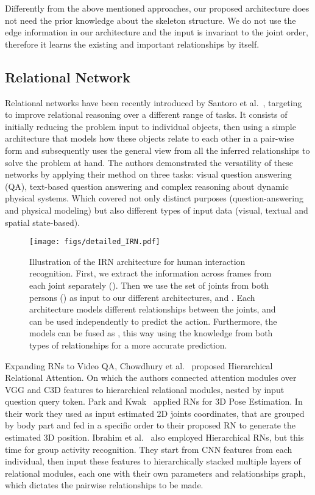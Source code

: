 \documentclass[journal,twoside]{IEEEtran}
\begin{document}
Differently from the above mentioned approaches, our proposed architecture does not need the prior knowledge about the skeleton structure.
We do not use the edge information in our architecture and the input is invariant to the joint order, therefore it learns the existing and important relationships by itself. 


\subsection{Relational Network}




Relational networks have been recently introduced by Santoro et al.~\cite{Santoro2017}, targeting to improve relational reasoning over a different range of tasks. 
It consists of initially reducing the problem input to individual objects, then using a simple architecture that models how these objects relate to each other in a pair-wise form and subsequently uses the general view from all the inferred relationships to solve the problem at hand.
The authors demonstrated the versatility of these networks by applying their method on three tasks: visual question answering (QA), text-based question answering and complex reasoning about dynamic physical systems. 
Which covered not only distinct purposes (question-answering and physical modeling) but also different types of input data (visual, textual and spatial state-based).



\begin{figure*}[!t] 
	\centering
	\texttt{[image: figs/detailed\_IRN.pdf]}
	\caption{Illustration of the IRN architecture for human interaction recognition. First, we extract the information across frames from each joint separately (). Then we use the set of joints from both persons () as input to our different architectures,  and . Each architecture models different relationships between the joints, and can be used independently to predict the action. Furthermore, the models can be fused as , this way using the knowledge from both types of relationships 
	for a more accurate prediction. 
}
	\label{fig:detailed_pipeline}
\end{figure*}

Expanding RNs to Video QA, Chowdhury et al.~\cite{Chowdhury2018} proposed Hierarchical Relational Attention. 
On which the authors connected attention modules over VGG and C3D features to hierarchical relational modules, nested by input question query token.
Park and Kwak~\cite{Park2018} applied RNs for 3D Pose Estimation. In their work they used as input estimated 2D joints coordinates, that are grouped by body part and fed in a specific order to their proposed RN to generate the estimated 3D position.
Ibrahim et al.~\cite{Ibrahim2018} also employed Hierarchical RNs, but this time for group activity recognition. 
They start from CNN features from each individual, then input these features to hierarchically stacked multiple layers of relational modules, each one with their own parameters and relationships graph, which dictates the pairwise relationships to be made.
\end{document}

